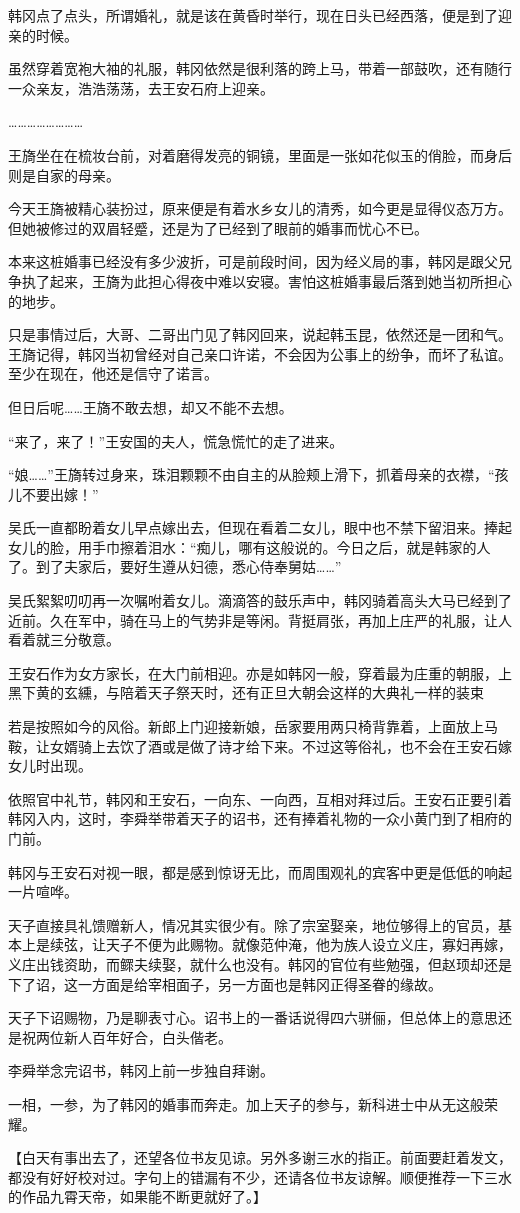韩冈点了点头，所谓婚礼，就是该在黄昏时举行，现在日头已经西落，便是到了迎亲的时候。

虽然穿着宽袍大袖的礼服，韩冈依然是很利落的跨上马，带着一部鼓吹，还有随行一众亲友，浩浩荡荡，去王安石府上迎亲。

……………………

王旖坐在在梳妆台前，对着磨得发亮的铜镜，里面是一张如花似玉的俏脸，而身后则是自家的母亲。

今天王旖被精心装扮过，原来便是有着水乡女儿的清秀，如今更是显得仪态万方。但她被修过的双眉轻蹙，还是为了已经到了眼前的婚事而忧心不已。

本来这桩婚事已经没有多少波折，可是前段时间，因为经义局的事，韩冈是跟父兄争执了起来，王旖为此担心得夜中难以安寝。害怕这桩婚事最后落到她当初所担心的地步。

只是事情过后，大哥、二哥出门见了韩冈回来，说起韩玉昆，依然还是一团和气。王旖记得，韩冈当初曾经对自己亲口许诺，不会因为公事上的纷争，而坏了私谊。至少在现在，他还是信守了诺言。

但日后呢……王旖不敢去想，却又不能不去想。

“来了，来了！”王安国的夫人，慌急慌忙的走了进来。

“娘……”王旖转过身来，珠泪颗颗不由自主的从脸颊上滑下，抓着母亲的衣襟，“孩儿不要出嫁！”

吴氏一直都盼着女儿早点嫁出去，但现在看着二女儿，眼中也不禁下留泪来。捧起女儿的脸，用手巾擦着泪水：“痴儿，哪有这般说的。今日之后，就是韩家的人了。到了夫家后，要好生遵从妇德，悉心侍奉舅姑……”

吴氏絮絮叨叨再一次嘱咐着女儿。滴滴答的鼓乐声中，韩冈骑着高头大马已经到了近前。久在军中，骑在马上的气势非是等闲。背挺肩张，再加上庄严的礼服，让人看着就三分敬意。

王安石作为女方家长，在大门前相迎。亦是如韩冈一般，穿着最为庄重的朝服，上黑下黄的玄纁，与陪着天子祭天时，还有正旦大朝会这样的大典礼一样的装束

若是按照如今的风俗。新郎上门迎接新娘，岳家要用两只椅背靠着，上面放上马鞍，让女婿骑上去饮了酒或是做了诗才给下来。不过这等俗礼，也不会在王安石嫁女儿时出现。

依照官中礼节，韩冈和王安石，一向东、一向西，互相对拜过后。王安石正要引着韩冈入内，这时，李舜举带着天子的诏书，还有捧着礼物的一众小黄门到了相府的门前。

韩冈与王安石对视一眼，都是感到惊讶无比，而周围观礼的宾客中更是低低的响起一片喧哗。

天子直接具礼馈赠新人，情况其实很少有。除了宗室娶亲，地位够得上的官员，基本上是续弦，让天子不便为此赐物。就像范仲淹，他为族人设立义庄，寡妇再嫁，义庄出钱资助，而鳏夫续娶，就什么也没有。韩冈的官位有些勉强，但赵顼却还是下了诏，这一方面是给宰相面子，另一方面也是韩冈正得圣眷的缘故。

天子下诏赐物，乃是聊表寸心。诏书上的一番话说得四六骈俪，但总体上的意思还是祝两位新人百年好合，白头偕老。

李舜举念完诏书，韩冈上前一步独自拜谢。

一相，一参，为了韩冈的婚事而奔走。加上天子的参与，新科进士中从无这般荣耀。

【白天有事出去了，还望各位书友见谅。另外多谢三水的指正。前面要赶着发文，都没有好好校对过。字句上的错漏有不少，还请各位书友谅解。顺便推荐一下三水的作品九霄天帝，如果能不断更就好了。】

